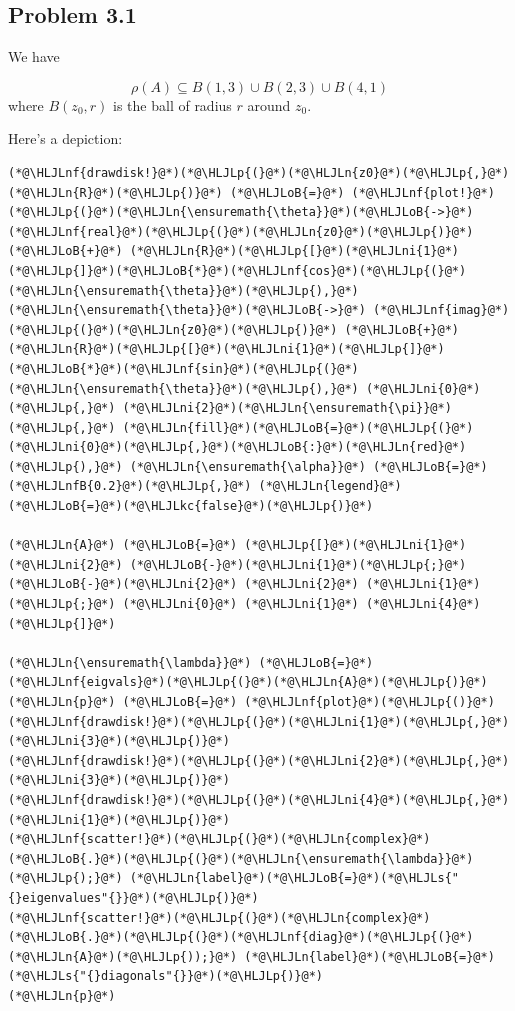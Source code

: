 \documentclass[12pt,a4paper]{article}
\newcommand{\HLJLkc}[1]{\textcolor[RGB]{59,151,46}{\textit{#1}}}
\newcommand{\HLJLn}[1]{#1}
\newcommand{\HLJLnf}[1]{\textcolor[RGB]{66,102,213}{#1}}
\newcommand{\HLJLs}[1]{\textcolor[RGB]{201,61,57}{#1}}
\newcommand{\HLJLnfB}[1]{\textcolor[RGB]{59,151,46}{#1}}
\newcommand{\HLJLni}[1]{\textcolor[RGB]{59,151,46}{#1}}
\newcommand{\HLJLoB}[1]{\textcolor[RGB]{102,102,102}{\textbf{#1}}}
\newcommand{\HLJLp}[1]{#1}
\begin{document}
\subsection{Problem 3.1}
We have 

\[
\rho(A) \subseteq B(1,3) \cup B(2,3) \cup B(4,1)
\]
where $B(z_0,r)$ is the ball of radius $r$ around $z_0$.

Here's a depiction:


\begin{lstlisting}
(*@\HLJLnf{drawdisk!}@*)(*@\HLJLp{(}@*)(*@\HLJLn{z0}@*)(*@\HLJLp{,}@*) (*@\HLJLn{R}@*)(*@\HLJLp{)}@*) (*@\HLJLoB{=}@*) (*@\HLJLnf{plot!}@*)(*@\HLJLp{(}@*)(*@\HLJLn{\ensuremath{\theta}}@*)(*@\HLJLoB{->}@*) (*@\HLJLnf{real}@*)(*@\HLJLp{(}@*)(*@\HLJLn{z0}@*)(*@\HLJLp{)}@*) (*@\HLJLoB{+}@*) (*@\HLJLn{R}@*)(*@\HLJLp{[}@*)(*@\HLJLni{1}@*)(*@\HLJLp{]}@*)(*@\HLJLoB{*}@*)(*@\HLJLnf{cos}@*)(*@\HLJLp{(}@*)(*@\HLJLn{\ensuremath{\theta}}@*)(*@\HLJLp{),}@*) (*@\HLJLn{\ensuremath{\theta}}@*)(*@\HLJLoB{->}@*) (*@\HLJLnf{imag}@*)(*@\HLJLp{(}@*)(*@\HLJLn{z0}@*)(*@\HLJLp{)}@*) (*@\HLJLoB{+}@*) (*@\HLJLn{R}@*)(*@\HLJLp{[}@*)(*@\HLJLni{1}@*)(*@\HLJLp{]}@*)(*@\HLJLoB{*}@*)(*@\HLJLnf{sin}@*)(*@\HLJLp{(}@*)(*@\HLJLn{\ensuremath{\theta}}@*)(*@\HLJLp{),}@*) (*@\HLJLni{0}@*)(*@\HLJLp{,}@*) (*@\HLJLni{2}@*)(*@\HLJLn{\ensuremath{\pi}}@*)(*@\HLJLp{,}@*) (*@\HLJLn{fill}@*)(*@\HLJLoB{=}@*)(*@\HLJLp{(}@*)(*@\HLJLni{0}@*)(*@\HLJLp{,}@*)(*@\HLJLoB{:}@*)(*@\HLJLn{red}@*)(*@\HLJLp{),}@*) (*@\HLJLn{\ensuremath{\alpha}}@*) (*@\HLJLoB{=}@*) (*@\HLJLnfB{0.2}@*)(*@\HLJLp{,}@*) (*@\HLJLn{legend}@*)(*@\HLJLoB{=}@*)(*@\HLJLkc{false}@*)(*@\HLJLp{)}@*)

(*@\HLJLn{A}@*) (*@\HLJLoB{=}@*) (*@\HLJLp{[}@*)(*@\HLJLni{1}@*) (*@\HLJLni{2}@*) (*@\HLJLoB{-}@*)(*@\HLJLni{1}@*)(*@\HLJLp{;}@*) (*@\HLJLoB{-}@*)(*@\HLJLni{2}@*) (*@\HLJLni{2}@*) (*@\HLJLni{1}@*)(*@\HLJLp{;}@*) (*@\HLJLni{0}@*) (*@\HLJLni{1}@*) (*@\HLJLni{4}@*)(*@\HLJLp{]}@*)

(*@\HLJLn{\ensuremath{\lambda}}@*) (*@\HLJLoB{=}@*) (*@\HLJLnf{eigvals}@*)(*@\HLJLp{(}@*)(*@\HLJLn{A}@*)(*@\HLJLp{)}@*)
(*@\HLJLn{p}@*) (*@\HLJLoB{=}@*) (*@\HLJLnf{plot}@*)(*@\HLJLp{()}@*)
(*@\HLJLnf{drawdisk!}@*)(*@\HLJLp{(}@*)(*@\HLJLni{1}@*)(*@\HLJLp{,}@*)(*@\HLJLni{3}@*)(*@\HLJLp{)}@*)
(*@\HLJLnf{drawdisk!}@*)(*@\HLJLp{(}@*)(*@\HLJLni{2}@*)(*@\HLJLp{,}@*)(*@\HLJLni{3}@*)(*@\HLJLp{)}@*)
(*@\HLJLnf{drawdisk!}@*)(*@\HLJLp{(}@*)(*@\HLJLni{4}@*)(*@\HLJLp{,}@*)(*@\HLJLni{1}@*)(*@\HLJLp{)}@*)
(*@\HLJLnf{scatter!}@*)(*@\HLJLp{(}@*)(*@\HLJLn{complex}@*)(*@\HLJLoB{.}@*)(*@\HLJLp{(}@*)(*@\HLJLn{\ensuremath{\lambda}}@*)(*@\HLJLp{);}@*) (*@\HLJLn{label}@*)(*@\HLJLoB{=}@*)(*@\HLJLs{"{}eigenvalues"{}}@*)(*@\HLJLp{)}@*)
(*@\HLJLnf{scatter!}@*)(*@\HLJLp{(}@*)(*@\HLJLn{complex}@*)(*@\HLJLoB{.}@*)(*@\HLJLp{(}@*)(*@\HLJLnf{diag}@*)(*@\HLJLp{(}@*)(*@\HLJLn{A}@*)(*@\HLJLp{));}@*) (*@\HLJLn{label}@*)(*@\HLJLoB{=}@*)(*@\HLJLs{"{}diagonals"{}}@*)(*@\HLJLp{)}@*)
(*@\HLJLn{p}@*)
\end{lstlisting}
\end{document}
